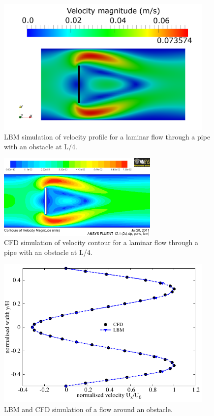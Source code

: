 \begin{figure}[!t]
\centering
\hspace{-13mm}\includegraphics[width=0.95\textwidth]{LBM_Obstacle}
\caption{LBM simulation of velocity profile for a laminar flow through a pipe 
with an obstacle at L/4.}
\label{fig:LBMobstacle}
\end{figure}

\begin{figure}[!ht]
\centering
\includegraphics[width=0.7\textwidth]{CFD_Obstacle}
\caption{CFD simulation of velocity contour for a laminar flow through a pipe 
with an obstacle at L/4.}
\label{fig:CFDobstacle}
\end{figure}

\begin{figure}[htbp]
\centering
\includegraphics[width=0.95\textwidth]{Obstacle}
\caption{LBM and CFD simulation of a flow around an obstacle.}
\label{fig:Obstacle}
\end{figure}


